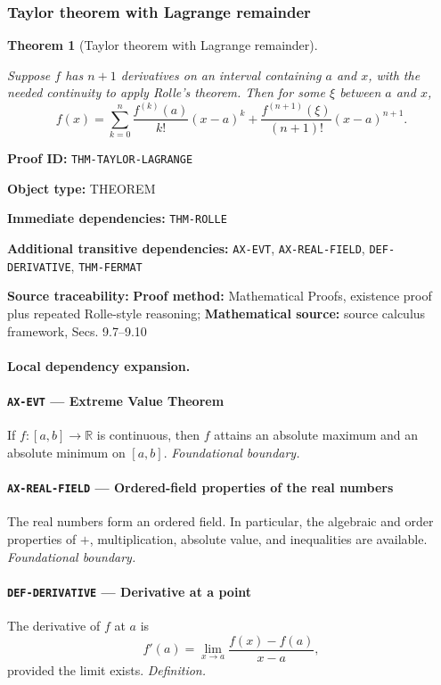 \documentclass[10pt]{article}
\newcommand{\pidraw}[1]{\begingroup\urlstyle{tt}\nolinkurl{#1}\endgroup}
\newtheorem{theorem}{Theorem}[section]
\theoremstyle{definition}
\theoremstyle{remark}
\newcommand{\meta}[2]{\noindent\textbf{#1:} #2\par}
\begin{document}
\subsubsection{Taylor theorem with Lagrange remainder}

\begin{theorem}[Taylor theorem with Lagrange remainder]\label{prf:THM-TAYLOR-LAGRANGE}

Suppose $f$ has $n+1$ derivatives on an interval containing $a$ and $x$, with the needed continuity to apply Rolle's theorem. Then for some $\xi$ between $a$ and $x$,
\[
f(x)=\sum_{k=0}^{n}\frac{f^{(k)}(a)}{k!}(x-a)^k
+\frac{f^{(n+1)}(\xi)}{(n+1)!}(x-a)^{n+1}.
\]

\end{theorem}

\meta{Proof ID}{\pidraw{THM-TAYLOR-LAGRANGE}}
\meta{Object type}{THEOREM}
\meta{Immediate dependencies}{\pidraw{THM-ROLLE}}
\meta{Additional transitive dependencies}{\pidraw{AX-EVT}, \pidraw{AX-REAL-FIELD}, \pidraw{DEF-DERIVATIVE}, \pidraw{THM-FERMAT}}
\meta{Source traceability}{\textbf{Proof method:} Mathematical Proofs, existence proof plus repeated Rolle-style reasoning; \textbf{Mathematical source:} source calculus framework, Secs. 9.7--9.10}

\paragraph{Local dependency expansion.}

\paragraph{\pidraw{AX-EVT} --- Extreme Value Theorem}
If $f:[a,b]\to\mathbb{R}$ is continuous, then $f$ attains an absolute maximum and an absolute minimum on $[a,b]$.
\textit{Foundational boundary.}

\paragraph{\pidraw{AX-REAL-FIELD} --- Ordered-field properties of the real numbers}
The real numbers form an ordered field. In particular, the algebraic and order properties of $+$, multiplication, absolute value, and inequalities are available.
\textit{Foundational boundary.}

\paragraph{\pidraw{DEF-DERIVATIVE} --- Derivative at a point}
The derivative of $f$ at $a$ is
\[
f'(a)=\lim_{x\to a}\frac{f(x)-f(a)}{x-a},
\]
provided the limit exists.
\textit{Definition.}
\end{document}

